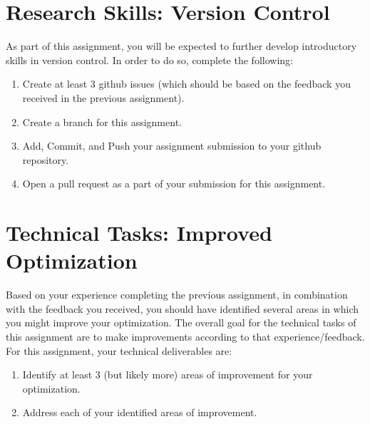 \documentclass[11pt]{article}
\begin{document}
	
	

\section{Research Skills: Version Control}

As part of this assignment, you will be expected to further develop introductory skills in version control.
In order to do so, complete the following:
\begin{enumerate}[label=\alph*.]
	\item Create at least 3 github issues (which should be based on the feedback you received in the previous assignment).
	\item Create a branch for this assignment.
	\item Add, Commit, and Push your assignment submission to your github repository.
	\item Open a pull request as a part of your submission for this assignment.
\end{enumerate}

	



\section{Technical Tasks: Improved Optimization}
	
Based on your experience completing the previous assignment, in combination with the feedback you received, you should have identified several areas in which you might improve your optimization.
The overall goal for the technical tasks of this assignment are to make improvements according to that experience/feedback.
For this assignment, your technical deliverables are:

\begin{enumerate}[label=\alph*.]
	\item Identify at least 3 (but likely more) areas of improvement for your optimization.
	\item Address each of your identified areas of improvement.
\end{enumerate}
	
	

\end{document}
